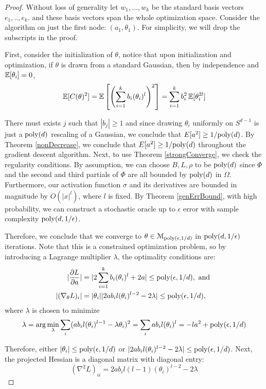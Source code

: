 \begin{proof}
Without loss of generality let $w_1,...,w_k$ be the standard basis vectors $e_1,..,e_k$. and these basis vectors span the whole optimization space. Consider the algorithm on just the first node: $(a_1,\theta_1)$. For simplicity, we will drop the subscripts in the proof. 

First, consider the initialization of $\theta$, notice that upon initialization and optimization, if $\theta$ is drawn from a standard Gaussian, then by independence and $\operatorname*{\mathbb{E}}[\theta_i] = 0$,
%
\[\operatorname*{\mathbb{E}}[C(\theta)^2] = \operatorname*{\mathbb{E}}\left[\left(\sum_{i=1}^k  b_i (\theta_i)^l\right)^2\right] = \sum_{i=1}^k b_i^2 \operatorname*{\mathbb{E}}[\theta_i^{2l}]\]

There must exists $j$ such that $|b_j|\geq 1$ and since drawing $\theta_i$ uniformly on $S^{d-1}$ is just a $\mathrm{poly}(d)$ rescaling of a Gaussian, we conclude that $E[a^2]\geq1/\mathrm{poly}(d)$. By Theorem \ref{nonDecrease}, we conclude that $E[a^2] \geq 1/\mathrm{poly}(d)$ throughout the gradient descent algorithm. Next, to use Theorem \ref{strongConverge}, we check the regularity conditions. By assumption, we can choose $B, L, \rho$ to be $\mathrm{poly}(d)$ since $\Phi$ and the second and third partials of $\Phi$ are all bounded by $\mathrm{poly}(d)$ in $\Omega$. Furthermore, our activation function $\sigma$ and its derivatives are bounded in magnitude by $O(|x|^{l})$, where $l$ is fixed. By Theorem \ref{genErrBound}, with high probability, we can construct a stochastic oracle up to $\epsilon$ error with sample complexity $\mathrm{poly}(d,1/\epsilon)$.


Therefore, we conclude that we converge to $\theta \in \mathcal{M}_{\mathrm{poly}(\epsilon,1/d)}$ in $\mathrm{poly}(d,1/\epsilon)$ iterations. Note that this is a constrained optimization problem, so by introducing a Lagrange multiplier $\lambda$, the optimality conditions are:
%
\begin{align*}
|\pd{L}{a}| & = |2\sum_{i=1}^k b_i (\theta_i)^l + 2a| \leq \poly(\epsilon,1/d), \textrm{ and } \\
%
 |(\nabla_\theta L)_i| & = |\theta_i||2ab_il(\theta_i)^{l-2}  -2\lambda| \leq \poly(\epsilon,1/d) ,
\end{align*}
where $\lambda$ is chosen to minimize
\[\lambda = \arg \min_\lambda \sum_i (ab_i l (\theta_i)^{l-1} - \lambda\theta_i)^2 = \sum_i ab_i l (\theta_i)^l = -la^2 + \mathrm{poly}(\epsilon,1/d) \]

Therefore, either $|\theta_i| \leq \mathrm{poly}(\epsilon,1/d)$ or $|2ab_il(\theta_i)^{l-2} - 2 \lambda |\leq \mathrm{poly}(\epsilon,1/d)$. Next, the projected Hessian is a diagonal matrix with diagonal entry: 
%
\[(\nabla^2 L)_{ii} = 2a b_i l(l-1)(\theta_i)^{l-2} - 2 \lambda\]


\end{proof}
